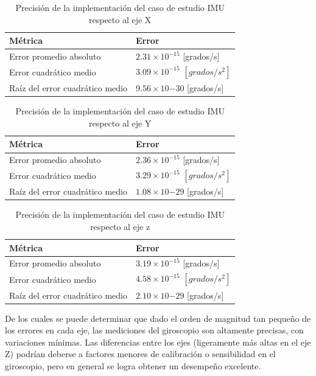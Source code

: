 \begin{table}[htbp!]
    \centering
    \caption{Precisión de la implementación del caso de estudio IMU respecto al eje X}
    \label{tab:filter-errorz}
    \begin{tabular}{ll}
    Métrica                       & Error \\ \hline
    Error promedio absoluto         &   $2.31 \times 10^{-15}$ [grados/s]    \\
    Error cuadrático medio          &   $3.09 \times 10^{-15}$ $[grados/s^{2}]$    \\
    Raíz del error cuadrático medio &   $9.56 \times 10{-30}$ [grados/s]  
    \end{tabular}
    \end{table}


\begin{table}[htbp!]
    \centering
    \caption{Precisión de la implementación del caso de estudio IMU respecto al eje Y}
    \label{tab:filter-errory}
    \begin{tabular}{ll}
    Métrica                       & Error \\ \hline
    Error promedio absoluto         &   $2.36 \times 10^{-15}$ [grados/s]    \\
    Error cuadrático medio          &   $3.29 \times 10^{-15}$ $[grados/s^{2}]$    \\
    Raíz del error cuadrático medio &   $1.08 \times 10{-29}$ [grados/s]  
    \end{tabular}
    \end{table}

\begin{table}[htbp!]
    \centering
    \caption{Precisión de la implementación del caso de estudio IMU respecto al eje z}
    \label{tab:filter-errorz}
    \begin{tabular}{ll}
    Métrica                       & Error \\ \hline
    Error promedio absoluto         &   $3.19 \times 10^{-15}$ [grados/s]    \\
    Error cuadrático medio          &   $4.58 \times 10^{-15}$ $[grados/s^{2}]$    \\
    Raíz del error cuadrático medio &   $2.10 \times 10{-29}$ [grados/s]  
    \end{tabular}
    \end{table}

De los cuales se puede determinar que dado el orden de magnitud tan pequeño de los errores en cada eje, las mediciones del giroscopio son altamente precisas, con variaciones mínimas. Las diferencias entre los ejes (ligeramente más altas en el eje Z) podrían deberse a factores menores de calibración o sensibilidad en el giroscopio, pero en general se logra obtener un desempeño excelente.


